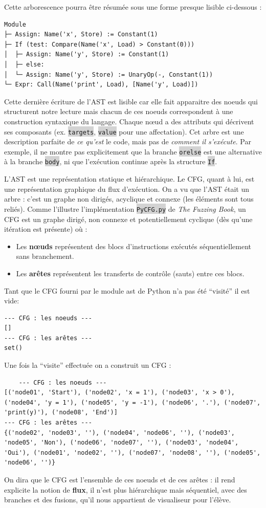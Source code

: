 \documentclass[11pt,a4paper]{article}
\newcommand{\code}[1]{\colorbox{lightgray}{\texttt{\small #1}}}
\begin{document}
Cette arborescence pourra être résumée sous une forme presque lisible ci-dessous :
\begin{verbatim}
Module
├─ Assign: Name('x', Store) := Constant(1)
├─ If (test: Compare(Name('x', Load) > Constant(0)))
│  ├─ Assign: Name('y', Store) := Constant(1)
│  ├─ else:
│  └─ Assign: Name('y', Store) := UnaryOp(-, Constant(1))
└─ Expr: Call(Name('print', Load), [Name('y', Load)])
\end{verbatim}
Cette dernière écriture de l'AST est lisible car elle fait apparaitre des noeuds qui structurent notre lecture mais
chacun de ces noeuds correspondent à une construction syntaxique du langage. Chaque nœud a des attributs qui décrivent ses 
composants (ex. \code{targets}, \code{value} pour une affectation).
Cet arbre est une description parfaite de \textit{ce qu'est} le code, mais pas de \textit{comment il s'exécute}. 
Par exemple, il ne montre pas explicitement que la branche \code{orelse} est une alternative à la branche 
\code{body}, ni que l'exécution continue après la structure \code{If}. \par  L'AST est une représentation statique et 
hiérarchique. Le CFG, quant à lui, est une représentation graphique du flux d'exécution.
On a vu que l'AST était un arbre : c'est un graphe non dirigés, acyclique et connexe (les éléments sont tous reliés).
Comme l'illustre l'implémentation \code{PyCFG.py} de \textit{The Fuzzing Book}, un CFG est un graphe dirigé, non
connexe et potentiellement cyclique (dès qu'une itération est présente) où :
\begin{itemize}
    \item Les \textbf{nœuds} représentent des blocs d'instructions exécutés séquentiellement sans branchement.
    \item Les \textbf{arêtes} représentent les transferts de contrôle (sauts) entre ces blocs.
\end{itemize}
Tant que le CFG fourni par le module ast de Python n'a pas été ``visité'' il est vide:
\begin{verbatim}
--- CFG : les noeuds ---
[]
--- CFG : les arêtes ---
set()
\end{verbatim}
Une fois la ``visite'' effectuée on a construit un CFG :
\begin{verbatim}
    --- CFG : les noeuds ---
[('node01', 'Start'), ('node02', 'x = 1'), ('node03', 'x > 0'), ('node04', 'y = 1'), ('node05', 'y = -1'), ('node06', '.'), ('node07', 'print(y)'), ('node08', 'End')]
--- CFG : les arêtes ---
{('node02', 'node03', ''), ('node04', 'node06', ''), ('node03', 'node05', 'Non'), ('node06', 'node07', ''), ('node03', 'node04', 'Oui'), ('node01', 'node02', ''), ('node07', 'node08', ''), ('node05', 'node06', '')}
\end{verbatim}
On dira que le CFG est l'ensemble de ces noeuds et de ces arêtes : il rend explicite la notion de \textbf{flux},
 il n'est plus hiérarchique mais séquentiel, avec des branches et des fusions, qu'il nous appartient de visualiseur
 pour l'élève.
\end{document}
